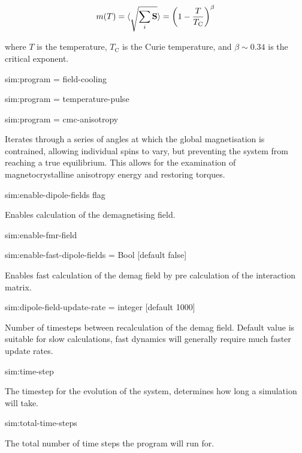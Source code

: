 \begin{equation}
m(T) = \langle{\sqrt{\sum_i \mathbf{S}}}\rangle = \left(1 - \frac{T}{T_{\mathrm{C}}} \right)^{\beta}
\end{equation}

\noindent where $T$ is the temperature, $T_{\mathrm{C}}$ is the Curie temperature, and $\beta \sim 0.34$ is the critical exponent.

{\zicf sim:program = field-cooling}

{\zicf sim:program = temperature-pulse}

{\zicf sim:program = cmc-anisotropy} Iterates through a series of angles at which the global magnetisation is contrained, allowing individual spins to vary, but preventing the system from reaching a true equilibrium. This allows for the examination of magnetocrystalline anisotropy energy and restoring torques.

{\zicf sim:enable-dipole-fields flag} Enables calculation of the demagnetising field.

{\zicf sim:enable-fmr-field}

{\zicf sim:enable-fast-dipole-fields = Bool [default false]} Enables fast calculation of the demag field by pre calculation of the interaction matrix.

{\zicf sim:dipole-field-update-rate = integer [default 1000]}
Number of timesteps between recalculation of the demag field. Default value is suitable for slow calculations, fast dynamics will generally require much faster update rates.

{\zicf sim:time-step} The timestep for the evolution of the system, determines how long a simulation will take.

{\zicf sim:total-time-steps} The total number of time steps the program will run for.


